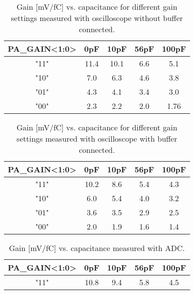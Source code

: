 \documentclass[../main/thesis.tex]{subfiles}
\begin{document}
\begin{table}[h!]
	\begin{center}
		\caption{Gain [mV/fC] vs. capacitance for different gain settings measured with oscilloscope without buffer connected.}
		\label{tab-gain-nobuffer}
		\begin{tabular}{ccccc}\toprule
			\textbf{PA\_GAIN<1:0>} & \textbf{0pF}  & \textbf{10pF} & \textbf{56pF} & \textbf{100pF} \\ \midrule
			"11"     & 11.4 & 10.1 & 6.6  & 5.1   \\
			"10"     & 7.0    & 6.3  & 4.6  & 3.8   \\
			"01"     & 4.3  & 4.1  & 3.4  & 3.0     \\
			"00"     & 2.3  & 2.2  & 2.0    & 1.76 \\ \bottomrule
		\end{tabular}
	\end{center}
\end{table}

\begin{table}[h!]
	\begin{center}
		\caption{Gain [mV/fC] vs. capacitance for different gain settings measured with oscilloscope with buffer connected.}
		\label{tab-gain-wbuffer}
		\begin{tabular}{ccccc}\toprule
			\textbf{PA\_GAIN<1:0>} & \textbf{0pF}  & \textbf{10pF} & \textbf{56pF} & \textbf{100pF} \\ \midrule
			"11"     & 10.2 & 8.6  & 5.4  & 4.3   \\
			"10"     & 6.0    & 5.4  & 4.0    & 3.2   \\
			"01"     & 3.6  & 3.5  & 2.9  & 2.5   \\
			"00"     & 2.0    & 1.9  & 1.6  & 1.4 \\ \bottomrule
		\end{tabular}
	\end{center}
\end{table}


\begin{table}[h!]
	\begin{center}
		\caption{Gain [mV/fC] vs. capacitance measured with ADC.}
		\label{tab-gain-adc}
		\begin{tabular}{ccccc}\toprule
			\textbf{PA\_GAIN<1:0>} & \textbf{0pF}  & \textbf{10pF} & \textbf{56pF} & \textbf{100pF} \\ \midrule
			"11"     & 10.8 & 9.4  & 5.8  & 4.5   \\ \bottomrule
		\end{tabular}
	\end{center}
\end{table}
\end{document}
